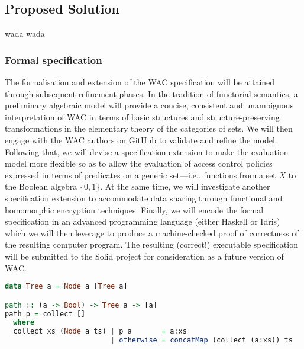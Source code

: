 \subsection{Proposed Solution}

wada wada

\subsubsection{Formal specification}
The formalisation and extension of the WAC specification will be
attained through subsequent refinement phases. In the tradition of
functorial semantics\cite{lawvere1963functorial, bonchi2017functorial},
a preliminary algebraic model will provide a concise, consistent and
unambiguous interpretation of WAC in terms of basic structures and
structure-preserving transformations in the elementary theory of the
categories of sets\cite{lawvere1964elementary, leinster2014rethinking}.
We will then engage with the WAC authors on GitHub to validate and
refine the model. Following that, we will devise a specification extension
to make the evaluation model more flexible so as to allow the evaluation
of access control policies expressed in terms of predicates on a generic
set---i.e., functions from a set $X$ to the Boolean algebra $\{0, 1\}$.
At the same time, we will investigate another specification extension
to accommodate data sharing through functional and homomorphic encryption
techniques. Finally, we will encode the formal specification in an
advanced programming language (either Haskell\cite{peytonjones:h98}
or Idris\cite{brady2013idris}) which we will then leverage to produce
a machine-checked proof of correctness of the resulting computer program.
The resulting (correct!) executable specification will be submitted to
the Solid project for consideration as a future version of WAC.

\begin{lstlisting}[language=Haskell]
data Tree a = Node a [Tree a]

path :: (a -> Bool) -> Tree a -> [a]
path p = collect []
  where
  collect xs (Node a ts) | p a       = a:xs
                         | otherwise = concatMap (collect (a:xs)) ts
\end{lstlisting}